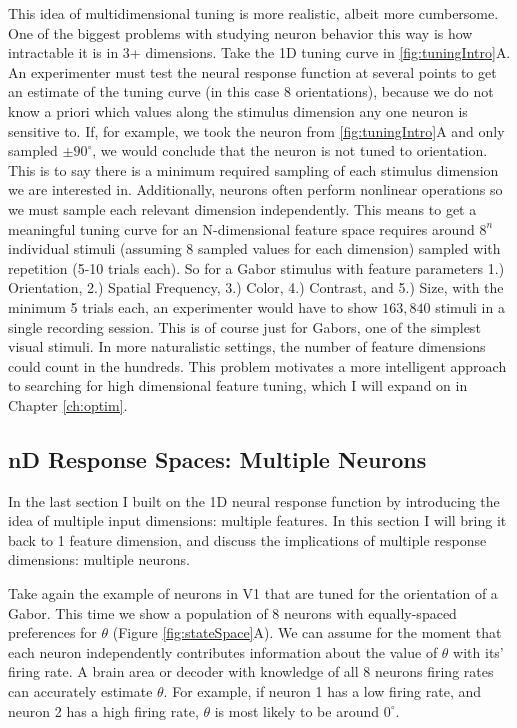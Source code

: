 This idea of multidimensional tuning is more realistic, albeit more cumbersome. One of the biggest problems with studying neuron behavior this way is how intractable it is in 3+ dimensions. Take the 1D tuning curve in \ref{fig:tuningIntro}A. An experimenter must test the neural response function at several points to get an estimate of the tuning curve (in this case 8 orientations), because we do not know a priori which values along the stimulus dimension any one neuron is sensitive to. If, for example, we took the neuron from \ref{fig:tuningIntro}A and only sampled $\pm 90^\circ$, we would conclude that the neuron is not tuned to orientation. This is to say there is a minimum required sampling of each stimulus dimension we are interested in. Additionally, neurons often perform nonlinear operations \parencite{Carandini2012} so we must sample each relevant dimension independently. This means to get a meaningful tuning curve for an N-dimensional feature space requires around $8^n$ individual stimuli (assuming 8 sampled values for each dimension) sampled with repetition (5-10 trials each). So for a Gabor stimulus with feature parameters 1.) Orientation, 2.) Spatial Frequency, 3.) Color, 4.) Contrast, and 5.) Size, with the minimum 5 trials each, an experimenter would have to show $163,840$ stimuli in a single recording session. This is of course just for Gabors, one of the simplest visual stimuli. In more naturalistic settings, the number of feature dimensions could count in the hundreds. This problem motivates a more intelligent approach to searching for high dimensional feature tuning, which I will expand on in Chapter \ref{ch:optim}.


\subsection{nD Response Spaces: Multiple Neurons}

In the last section I built on the 1D neural response function by introducing the idea of multiple input dimensions: multiple features. In this section I will bring it back to 1 feature dimension, and discuss the implications of multiple response dimensions: multiple neurons.

Take again the example of neurons in V1 that are tuned for the orientation of a Gabor. This time we show a population of 8 neurons with equally-spaced preferences for $\theta$ (Figure \ref{fig:stateSpace}A). We can assume for the moment that each neuron independently contributes information about the value of $\theta$ with its' firing rate. A brain area or decoder with knowledge of all 8 neurons firing rates can accurately estimate $\theta$. For example, if neuron 1 has a low firing rate, and neuron 2 has a high firing rate, $\theta$ is most likely to be around $0^\circ$.

